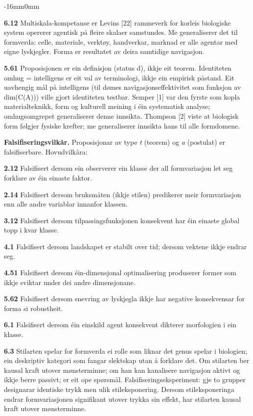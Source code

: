 \documentclass[10pt,oneside]{book}
\newenvironment{widebody}{%
  \begin{adjustwidth}{-16mm}{0mm}%
}{%
  \end{adjustwidth}%
}
\begin{document}
\begin{widebody}
{\textbf{6.12} Multiskala-kompetanse er Levins [22] rammeverk for korleis biologiske system opererer agentisk på fleire skalaer samstundes. Me generaliserer det til formverda: celle, materiale, verktøy, handverkar, marknad er alle agentar med eigne lyskjegler. Forma er resultatet av deira samtidige navigasjon.

\textbf{5.61} Proposisjonen er ein definisjon (status d), ikkje eit teorem. Identiteten omhug = intelligens er eit val av terminologi, ikkje ein empirisk påstand. Eit uavhengig mål på intelligens (til dømes navigasjonseffektivitet som funksjon av dim(C(A))) ville gjort identiteten testbar. Semper [1] var den fyrste som kopla materialteknikk, form og kulturell meining i éin systematisk analyse; omhugsomgrepet generaliserer denne innsikta. Thompson [2] viste at biologisk form følgjer fysiske krefter; me generaliserer innsikta hans til alle formdomene.

\bigskip
\textbf{Falsifiseringsvilkår.} Proposisjonar av type \textit{t} (teorem) og \textit{a} (postulat) er falsifiserbare. Hovudvilkåra:

\textbf{2.12} Falsifisert dersom ein observerer ein klasse der all formvariasjon let seg forklare av éin einaste faktor.

\textbf{2.14} Falsifisert dersom bruksmåten (ikkje stilen) predikerer meir formvariasjon enn alle andre variablar innanfor klassen.

\textbf{3.12} Falsifisert dersom tilpassingsfunksjonen konsekvent har éin einaste global topp i kvar klasse.

\textbf{4.1} Falsifisert dersom landskapet er stabilt over tid; dersom vektene ikkje endrar seg.

\textbf{4.51} Falsifisert dersom éin-dimensjonal optimalisering produserer former som ikkje sviktar under dei andre dimensjonane.

\textbf{5.62} Falsifisert dersom snevring av lyskjegla ikkje har negative konsekvensar for forma si robustheit.

\textbf{6.1} Falsifisert dersom éin einskild agent konsekvent dikterer morfologien i ein klasse.

\textbf{6.3} Stilarten spelar for formverda ei rolle som liknar det genus spelar i biologien; ein deskriptiv kategori som fangar slektskap utan å forklare det. Om stilarten ber kausal kraft utover mønsterminne; om han kan kanalisere navigasjon aktivt og ikkje berre passivt; er eit ope spørsmål. Falsifiseringseksperiment: gje to grupper designarar identiske trykk men ulik stileksponering. Dersom stileksponeringa endrar formvariasjonen signifikant utover trykka sin effekt, har stilarten kausal kraft utover mønsterminne.

}
\end{widebody}
\end{document}
